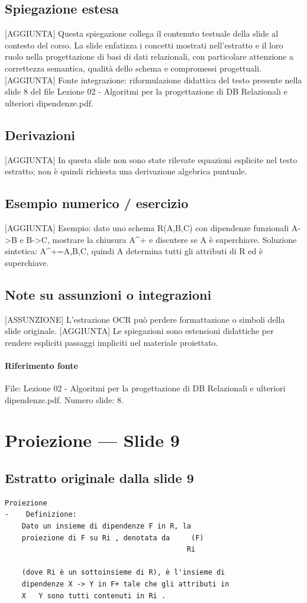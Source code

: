 \documentclass[11pt]{article}
\begin{document}
\subsection*{Spiegazione estesa}
[AGGIUNTA] Questa spiegazione collega il contenuto testuale della slide al contesto del corso. La slide enfatizza i concetti mostrati nell'estratto e il loro ruolo nella progettazione di basi di dati relazionali, con particolare attenzione a correttezza semantica, qualità dello schema e compromessi progettuali.
[AGGIUNTA] Fonte integrazione: riformulazione didattica del testo presente nella slide 8 del file Lezione 02 - Algoritmi per la progettazione di DB Relazionali e ulteriori dipendenze.pdf.
\subsection*{Derivazioni}
[AGGIUNTA] In questa slide non sono state rilevate equazioni esplicite nel testo estratto; non è quindi richiesta una derivazione algebrica puntuale.
\subsection*{Esempio numerico / esercizio}
[AGGIUNTA] Esempio: dato uno schema R(A,B,C) con dipendenze funzionali A->B e B->C, mostrare la chiusura A^+ e discutere se A è superchiave. Soluzione sintetica: A^+={A,B,C}, quindi A determina tutti gli attributi di R ed è superchiave.
\subsection*{Note su assunzioni o integrazioni}
[ASSUNZIONE] L'estrazione OCR può perdere formattazione o simboli della slide originale.
[AGGIUNTA] Le spiegazioni sono estensioni didattiche per rendere espliciti passaggi impliciti nel materiale proiettato.
\paragraph{Riferimento fonte} File: Lezione 02 - Algoritmi per la progettazione di DB Relazionali e ulteriori dipendenze.pdf. Numero slide: 8.
\section{Proiezione --- Slide 9}
\subsection*{Estratto originale dalla slide 9}
\begin{lstlisting}
Proiezione
-    Definizione:
    Dato un insieme di dipendenze F in R, la
    proiezione di F su Ri , denotata da     (F)
                                           Ri

    (dove Ri è un sottoinsieme di R), è l'insieme di
    dipendenze X -> Y in F+ tale che gli attributi in
    X   Y sono tutti contenuti in Ri .
\end{lstlisting}
\end{document}
